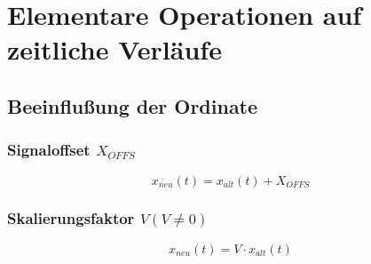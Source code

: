 \section{Elementare Operationen auf zeitliche Verläufe}
\subsection*{Beeinflußung der Ordinate}

\begin{multicols}{2}
 \subsubsection*{Signaloffset \texorpdfstring{$X_{OFFS}$}{}}
  \begin{equation*}
   x_{neu}\left(t\right) = x_{alt}\left(t\right) + X_{OFFS} 
  \end{equation*}
\vfill
  \begin{center}
  
  \end{center}
\end{multicols}

\begin{multicols}{2}
 \subsubsection*{Skalierungsfaktor \texorpdfstring{$V \left(V \neq 0 \right) $}{}}
  \begin{equation*}
   x_{neu}\left(t\right) = V \cdot x_{alt}\left(t\right) 
  \end{equation*}
\vfill
  \begin{center}
  
  \end{center}
\end{multicols}

